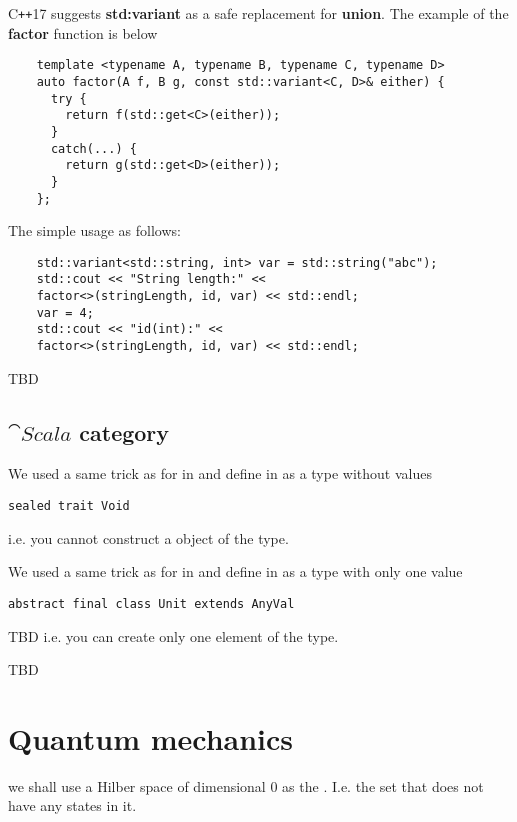 \begin{example}
  C\texttt{++}17 suggests \textbf{std:variant} as a safe replacement
  for \textbf{union}. The example of the \textbf{factor}
  function is below
  \begin{verbatim}
    template <typename A, typename B, typename C, typename D>
    auto factor(A f, B g, const std::variant<C, D>& either) {
      try {
        return f(std::get<C>(either));               
      }
      catch(...) {
        return g(std::get<D>(either));                              
      }
    };
  \end{verbatim}
  The simple usage as follows:
  \begin{verbatim}
    std::variant<std::string, int> var = std::string("abc");
    std::cout << "String length:" <<
    factor<>(stringLength, id, var) << std::endl;
    var = 4;
    std::cout << "id(int):" <<
    factor<>(stringLength, id, var) << std::endl;    
  \end{verbatim}

\end{example}
TBD
\subsection{$\cat{Scala}$ category}
\begin{example}
\label{ex:scala_initial_object}
We used a same trick as for  in
 and define
 in  as a
type without values 
\begin{verbatim}
sealed trait Void
\end{verbatim}
i.e. you cannot construct a object of the type.
\end{example}

\begin{example}
\label{ex:scala_terminal_object}
We used a same trick as for 
in  and define
 in  as a
type with only one value
\begin{verbatim}
abstract final class Unit extends AnyVal
\end{verbatim}
TBD
i.e. you can create only one element of the type.
\end{example}

TBD

\section{Quantum mechanics}
\begin{example}
\label{ex:quant_initial_object}
we shall use a Hilber space of dimensional 0 as the
. I.e. the set that does not have any
states in it.
\end{example}

